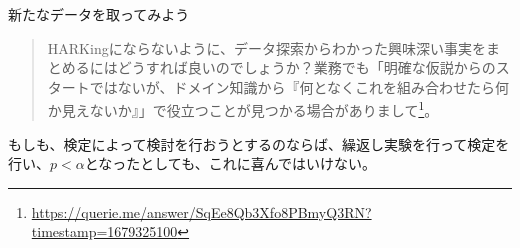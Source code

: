 \begin{SMbox}{新たなデータを取ってみよう}
  \begin{quote}    HARKingにならないように、データ探索からわかった興味深い事実をまとめるにはどうすれば良いのでしょうか？業務でも「明確な仮説からのスタートではないが、ドメイン知識から『何となくこれを組み合わせたら何か見えないか』」で役立つことが見つかる場合がありまして\footnote{\url{https://querie.me/answer/SqEe8Qb3Xfo8PBmyQ3RN?timestamp=1679325100}}。
  \end{quote}
  もしも、検定によって検討を行おうとするのならば、繰返し実験を行って検定を行い、$p<\alpha$となったとしても、これに喜んではいけない。
\end{SMbox}

\fi

